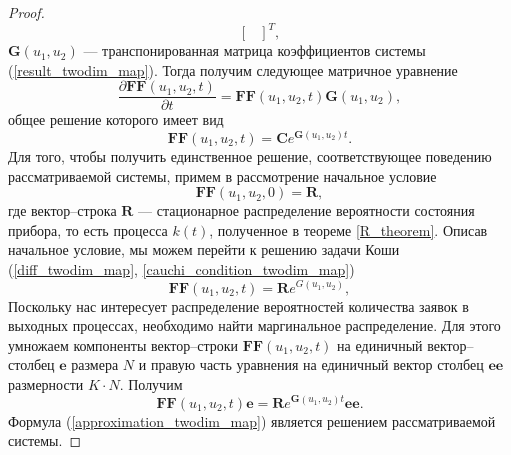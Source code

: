 \begin{proof}
\begin{equation*}
\begin{bmatrix}
		\end{bmatrix}^{T},
	\end{equation*}
	$\boldsymbol{G}(u_{1},u_{2})$ --- транспонированная матрица коэффициентов системы (\ref{result_twodim_map}).
	Тогда получим следующее матричное уравнение
	\begin{equation*}
		\frac{{\partial \boldsymbol{FF}(u_{1},u_{2},t)}}{{\partial t}} =\boldsymbol{FF}(u_{1},u_{2},t)\boldsymbol{G}(u_{1},u_{2}),
	\end{equation*}
	общее решение которого имеет вид
	\begin{equation} \label{diff_twodim_map}
		\boldsymbol{FF}(u_{1},u_{2},t)=\boldsymbol{C}e^{\boldsymbol{G}(u_{1},u_{2})t}.
	\end{equation}
	Для того, чтобы получить единственное решение, соответствующее поведению рассматриваемой системы, примем в рассмотрение начальное условие
	\begin{equation} \label{cauchi_condition_twodim_map}
		\boldsymbol{FF}(u_{1},u_{2},0)=\boldsymbol{R},
	\end{equation}
	где вектор--строка $\boldsymbol{R}$ --- стационарное распределение вероятности состояния прибора, то есть процесса $k(t)$, полученное в теореме \ref{R_theorem}.
	Описав начальное условие, мы можем перейти к решению задачи Коши (\ref{diff_twodim_map}, \ref{cauchi_condition_twodim_map})
	\begin{equation*} 
		\boldsymbol{FF}(u_{1},u_{2},t)=\boldsymbol{R}e^{G(u_{1},u_{2})},
	\end{equation*}
	Поскольку нас интересует распределение вероятностей количества заявок в выходных процессах, необходимо найти маргинальное распределение. Для этого умножаем компоненты вектор--строки $\boldsymbol{FF}(u_{1},u_{2},t)$ на единичный вектор--столбец $\boldsymbol{e}$ размера $N$ и правую часть уравнения на единичный вектор столбец $\boldsymbol{ee}$ размерности $K \cdot N$. Получим
	\begin{equation}\label{approximation_twodim_map}
		\boldsymbol{FF}(u_{1},u_{2},t)\boldsymbol{e}=\boldsymbol{R}e^{\boldsymbol{G}(u_{1},u_{2})t}\boldsymbol{ee}.
	\end{equation}
	Формула (\ref{approximation_twodim_map}) является решением рассматриваемой системы. 
\end{proof}

